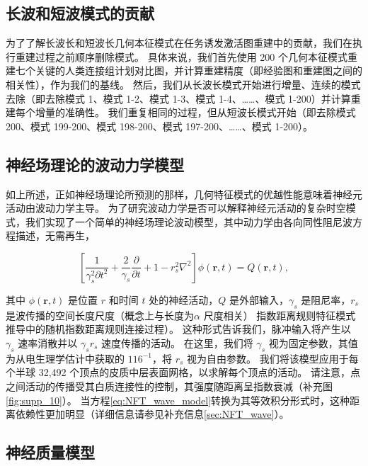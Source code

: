\documentclass[lang=cn,a4paper,newtx]{elegantpaper}
\begin{document}
\subsection{长波和短波模式的贡献} \label{sec:wavelength_contributions}

为了了解长波长和短波长几何本征模式在任务诱发激活图重建中的贡献，我们在执行重建过程之前顺序删除模式。
具体来说，我们首先使用 200 个几何本征模式重建七个关键的人类连接组计划对比图，并计算重建精度（即经验图和重建图之间的相关性），作为我们的基线。
然后，我们从长波长模式开始进行增量、连续的模式去除（即去除模式 1、模式 1-2、模式 1-3、模式 1-4、……、模式 1-200）并计算重建每个增量的准确性。
我们重复相同的过程，但从短波长模式开始（即去除模式 200、模式 199-200、模式 198-200、模式 197-200、……、模式 1-200）。


\subsection{神经场理论的波动力学模型} \label{NFT_model}

如上所述，正如神经场理论所预测的那样，几何特征模式的优越性能意味着神经元活动由波动力学主导。
为了研究波动力学是否可以解释神经元活动的复杂时空模式，我们实现了一个简单的神经场理论波动模型，其中动力学由各向同性阻尼波方程描述，无需再生\cite{jirsa1996field,robinson1997propagation}，

\begin{equation}\label{eq:NFT_wave_model}
	[\frac{1}{\gamma_s^2 \partial t^2} + \frac{2}{\gamma_s} \frac{\partial}{\partial t} + 1 - r_s^2 \nabla^2] \phi(\boldsymbol{r}, t) = Q(\boldsymbol{r}, t),
\end{equation}

其中 $ \phi(\boldsymbol{r}, t) $ 是位置 $ r $ 和时间 $ t $ 处的神经活动，$ Q $ 是外部输入，$ \gamma_s $ 是阻尼率，$ r_s $ 是波传播的空间长度尺度（概念上与长度为$ \alpha $ 尺度相关） 指数距离规则特征模式推导中的随机指数距离规则连接过程）。
这种形式告诉我们，脉冲输入将产生以 $ \gamma_s $ 速率消散并以 $ \gamma_s r_s $ 速度传播的活动。
在这里，我们将 $ \gamma_s $ 视为固定参数，其值为从电生理学估计中获取的 $ 116^{-1} $\cite{robinson2005multiscale}，将 $ r_s $ 视为自由参数。
我们将该模型应用于每个半球 32,492 个顶点的皮质中层表面网格，以求解每个顶点的活动。
请注意，点之间活动的传播受其白质连接性的控制，其强度随距离呈指数衰减（补充图\ref{fig:supp_10}）。
当方程\ref{eq:NFT_wave_model}转换为其等效积分形式时，这种距离依赖性更加明显（详细信息请参见补充信息\ref{sec:NFT_wave}）。


\subsection{神经质量模型} \label{sec:neural_mass}
\end{document}
